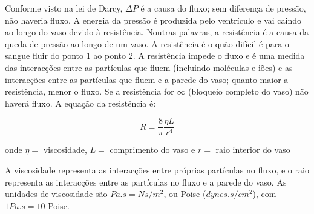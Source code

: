 \documentclass[
  portuguese,
  ]{book}
\begin{document}
Conforme visto na lei de Darcy, \(\Delta P\) é a causa do fluxo; sem diferença de pressão, não haveria fluxo. A energia da pressão é produzida pelo ventrículo e vai caindo ao longo do vaso devido à resistência. Noutras palavras, a resistência é a causa da queda de pressão ao longo de um vaso.
A resistência é o quão difícil é para o sangue fluir do ponto 1 ao ponto 2. A resistência impede o fluxo e é uma medida das interacções entre as partículas que fluem (incluindo moléculas e iões) e as interacções entre as partículas que fluem e a parede do vaso; quanto maior a resistência, menor o fluxo. Se a resistência for \(\infty\) (bloqueio completo do vaso) não haverá fluxo. A equação da resistência é:

\begin{equation}
R=\frac{8}{\pi}\frac{\eta L}{r^4}
\label{eq:resis}
\end{equation}

onde \(\eta=\) viscosidade, \(L=\) comprimento do vaso e \(r=\) raio interior do vaso

A viscosidade representa as interacções entre próprias partículas no fluxo, e o raio representa as interacções entre as partículas no fluxo e a parede do vaso. As unidades de viscosidade são \(Pa.s = Ns / m^2\), ou Poise (\(dynes.s / cm^2\)), com \(1 Pa.s = 10\) Poise.
\end{document}
